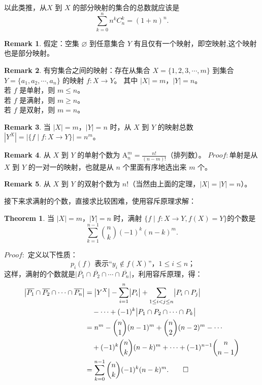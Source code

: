 \documentclass[oneside]{book}
\theoremstyle{definition}
\newtheorem{theorem}{Theorem}[section]
\newtheorem{remark}{Remark}[section]
\begin{document}
	以此类推，从\( X \) 到 \( X \) 的部分映射的集合的总数就应该是
	$$\sum_{k=0}^{n}n^kC_n^k=(1+n)^n.$$
	
	
	\begin{remark}
		假定：空集 $\varnothing$ 到任意集合 \( Y \) 有且仅有一个映射，即空映射,这个映射也是部分映射。
	\end{remark}
	
	\begin{remark}
		有穷集合之间的映射：存在从集合 \( X = \{1,2,3,\cdots,m\} \) 到集合 \( Y = \{a_1,a_2,\cdots,a_n\} \) 的映射 \( f: X \to Y \)。
	其中 \( |X| = m \)，\( |Y| = n \)。\\
	 若 \( f \) 是单射，则 \( m \leq n \)。\\
	若 \( f \) 是满射，则 \( m \geq n \)。\\
	若 \( f \) 是双射，则 \( m = n \)。
\end{remark}
	
	\begin{remark}
		当 \( |X| = m \)，\( |Y| = n \) 时，从 \( X \) 到 \( Y \) 的映射总数 \( |Y^X| = |\{f \mid f: X \to Y\}| = n^m \)。
	\end{remark}
	
	\begin{remark}
		从 \( X \) 到 \( Y \) 的单射个数为 \( \mathrm{A}_n^m=\frac{n!}{(n - m)!} \)（排列数）。
		$Proof:$单射是从 \( X \) 到 \( Y \) 的一对一的映射，也就是从 \( n \) 个里面有序地选出来 \( m \) 个。
	\end{remark}
	
	\begin{remark}
		从 \( X \) 到 \( Y \) 的双射个数为 \( n! \)（当然由上面的定理，\( |X| =  |Y| = n \)）。
	\end{remark}
	
	接下来求满射的个数，直接求比较困难，使用容斥原理求解：
	\begin{theorem}
		当 \( |X| = m \)，\( |Y| = n \) 时，满射 \( \{f \mid f: X \to Y, f(X) = Y\} \)的个数是
		$$\sum_{k=1}^{n-1} \binom{n}{k} (-1)^k (n-k)^m.$$
	\end{theorem}
	\noindent$Proof:$
		定义以下性质：
		\[
			\ p_i(f) \text{ 表示“} y_i \notin f(X) \text{”，} 1 \leq i \leq n \text{；} 
		\]
		这样，满射的个数就是$ \bigl| \overline{P_1} \cap \overline{P_2} \cap \cdots \cap \overline{P_n} \bigr|$，利用容斥原理，得：
		\[
		\begin{aligned}
			\bigl| \overline{P_1} \cap \overline{P_2} \cap \cdots \cap \overline{P_n} \bigr| 
			&= \bigl| Y^X \bigr| - \sum_{i=1}^{n} \bigl| P_i \bigr| + \sum_{1 \leq i < j \leq n} \bigl| P_i \cap P_j \bigr| \\
			&\quad - \cdots + (-1)^k \bigl| P_1 \cap P_2 \cap \cdots \cap P_k \bigr| \\
			&= n^m - \binom{n}{1}(n-1)^m + \binom{n}{2}(n-2)^m - \cdots \\
			&\quad + (-1)^k \binom{n}{k}(n-k)^m + \cdots + (-1)^{n-1} \binom{n}{n-1} \\
			&= \sum_{k=0}^{n-1} \binom{n}{k} (-1)^k (n-k)^m. \qed
		\end{aligned}
		\]
	
\end{document}
